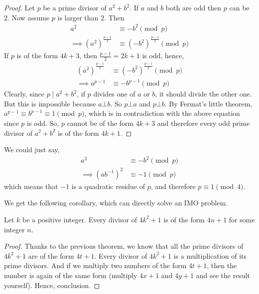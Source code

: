 \begin{proof}
	Let $p$ be a prime divisor of $a^2+b^2$. If $a$ and $b$ both are odd then $p$ can be $2$. Now assume $p$ is larger than $2$. Then
		\begin{align*}
			a^2
				& \equiv-b^2 \pmod p\\
			\implies \left(a^2\right)^{\frac{p-1}{2}}
				& \equiv \left(-b^2\right)^{\frac{p-1}{2}}\pmod p
		\end{align*}
	If $p$ is of the form $4k+3$, then $\frac{p-1}{2}=2k+1$ is odd, hence,
		\begin{align*}
		\left(a^2\right)^{\frac{p-1}{2}}
			& \equiv \left(-b^2\right)^{\frac{p-1}{2}}\pmod p\\
		\implies a^{p-1}
			& \equiv -b^{p-1} \pmod p
		\end{align*}
	Clearly, since $p\mid a^2+b^2$, if $p$ divides one of $a$ or $b$, it should divide the other one. But this is impossible because $a \bot b$. So $p \bot a$ and $p \bot b$. By Fermat's little theorem, $a^{p-1} \equiv b^{p-1} \equiv 1 \pmod p$, which is in contradiction with the above equation since $p$ is odd.
	So, $p$ cannot be of the form $4k+3$ and therefore every odd prime divisor of $a^2+b^2$ is of the form $4k+1$.
\end{proof}

\begin{note}
We could just say,
		\begin{align*}
			a^2
				& \equiv-b^2\pmod p\\
			\implies (ab^{-1})^2
				& \equiv-1\pmod p
		\end{align*}
	which means that $-1$ is a quadratic residue of $p$, and therefore $p\equiv1\pmod4$.
\end{note}
We get the following corollary, which can directly solve an IMO problem.
\begin{corollary}\label{cor:4n+1}
	Let $k$ be a positive integer. Every divisor of $4k^2+1$ is of the form $4n+1$ for some integer $n$.
\end{corollary}

\begin{proof}
	Thanks to the previous theorem, we know that all the prime divisors of $4k^2+1$ are of the form $4t+1$. Every divisor of $4k^2+1$ is a multiplication of its prime divisors. And if we multiply two numbers of the form $4t+1$, then the number is again of the same form (multiply $4x+1$ and $4y+1$ and see the result yourself). Hence, conclusion.
\end{proof}

